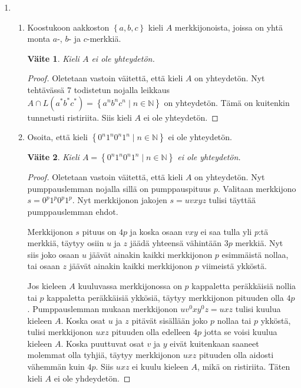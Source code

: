 \documentclass[a4paper,11pt, draft]{article}
\newtheorem*{claim}{Väite}
\newcommand{\set}[1]{{\left\{ #1 \right\}}}
\newcommand{\Nat}{\mathbb{N}}
\begin{document}
\begin{enumerate}
  \item
    \begin{enumerate}
      \item
        Koostukoon aakkoston $\set{a,b,c}$ kieli $A$ merkkijonoista, joissa on
        yhtä monta $a$-, $b$- ja $c$-merkkiä.
        \begin{claim}
          Kieli $A$ ei ole yhteydetön.
        \end{claim}
        \begin{proof}
          Oletetaan vastoin väitettä, että kieli $A$ on yhteydetön. Nyt
          tehtävässä 7 todistetun nojalla leikkaus $A \cap L(a^*b^*c^*) =
          \set{a^nb^nc^n \mid n \in \Nat}$ on yhteydetön. Tämä on kuitenkin
          tunnetusti ristiriita. Siis kieli $A$ ei ole yhteydetön.
        \end{proof}

      \item
        Osoita, että kieli $\set{0^n1^n0^n1^n \mid n \in \Nat}$ ei ole
        yhteydetön.
        \begin{claim}
          Kieli $A = \set{0^n1^n0^n1^n \mid n \in \Nat}$ ei ole yhteydetön.
        \end{claim}
        \begin{proof}
          Oletetaan vastoin väitettä, että kieli $A$ on yhteydetön. Nyt
          pumppauslemman nojalla sillä on pumppauspituus $p$. Valitaan
          merkkijono $s = 0^p1^p0^p1^p$. Nyt merkkijonon jakojen $s = uvxyz$
          tulisi täyttää pumppauslemman ehdot.

          Merkkijonon $s$ pituus on $4p$ ja koska osaan $vxy$ ei saa tulla yli
          $p$:tä merkkiä, täytyy osiin $u$ ja $z$ jäädä yhteensä vähintään
          $3p$ merkkiä. Nyt siis joko osaan $u$ jäävät ainakin kaikki
          merkkijonon $p$ esimmäistä nollaa, tai osaan $z$ jäävät ainakin
          kaikki merkkijonon $p$ viimeistä ykköstä.

          Jos kieleen $A$ kuuluvassa merkkijonossa on $p$ kappaletta
          peräkkäisiä nollia tai $p$ kappaletta peräkkäisiä ykkösiä, täytyy
          merkkijonon pituuden olla $4p$. Pumppauslemman mukaan merkkijonon
          $uv^0xy^0z = uxz$ tulisi kuulua kieleen $A$. Koska osat $u$ ja $z$
          pitävät sisällään joko $p$ nollaa tai $p$ ykköstä, tulisi
          merkkijonon $uxz$ pituuden olla edelleen $4p$ jotta se voisi kuulua
          kieleen $A$. Koska puuttuvat osat $v$ ja $y$ eivät kuitenkaan
          saaneet molemmat olla tyhjiä, täytyy merkkijonon $uxz$ pituuden olla
          aidosti vähemmän kuin $4p$. Siis $uxz$ ei kuulu kieleen $A$, mikä on
          ristiriita. Täten kieli $A$ ei ole yhdeydetön.
        \end{proof}
    \end{enumerate}


\end{enumerate}
\end{document}
